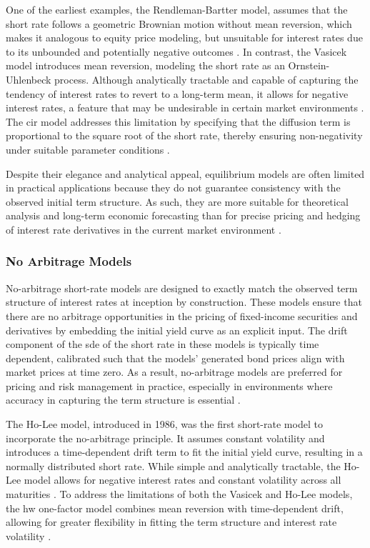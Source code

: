 One of the earliest examples, the Rendleman-Bartter model, assumes that the short rate follows a geometric Brownian motion without mean reversion, which makes it analogous to equity price modeling, but unsuitable for interest rates due to its unbounded and potentially negative outcomes \parencite[p.~708]{hull2015optionsfutures}. In contrast, the Vasicek model introduces mean reversion, modeling the short rate as an Ornstein-Uhlenbeck process. Although analytically tractable and capable of capturing the tendency of interest rates to revert to a long-term mean, it allows for negative interest rates, a feature that may be undesirable in certain market environments \parencite[pp.~708--709]{hull2015optionsfutures}. The \ac{cir} model addresses this limitation by specifying that the diffusion term is proportional to the square root of the short rate, thereby ensuring non-negativity under suitable parameter conditions \parencite[p.~710]{hull2015optionsfutures}.

Despite their elegance and analytical appeal, equilibrium models are often limited in practical applications because they do not guarantee consistency with the observed initial term structure. As such, they are more suitable for theoretical analysis and long-term economic forecasting than for precise pricing and hedging of interest rate derivatives in the current market environment \parencite[pp.~707--714]{hull2015optionsfutures}.

\subsubsection{No Arbitrage Models} \label{no_arbitrage_models}
No-arbitrage short-rate models are designed to exactly match the observed term structure of interest rates at inception by construction. These models ensure that there are no arbitrage opportunities in the pricing of fixed-income securities and derivatives by embedding the initial yield curve as an explicit input. The drift component of the \ac{sde} of the short rate in these models is typically time dependent, calibrated such that the models' generated bond prices align with market prices at time zero. As a result, no-arbitrage models are preferred for pricing and risk management in practice, especially in environments where accuracy in capturing the term structure is essential \parencite[pp.~714--715]{hull2015optionsfutures}.

The Ho-Lee model, introduced in 1986, was the first short-rate model to incorporate the no-arbitrage principle. It assumes constant volatility and introduces a time-dependent drift term to fit the initial yield curve, resulting in a normally distributed short rate. While simple and analytically tractable, the Ho-Lee model allows for negative interest rates and constant volatility across all maturities \parencite[pp.~715--716]{hull2015optionsfutures}. To address the limitations of both the Vasicek and Ho-Lee models, the \ac{hw} one-factor model combines mean reversion with time-dependent drift, allowing for greater flexibility in fitting the term structure and interest rate volatility \parencite[pp.~716--718]{hull2015optionsfutures}.

